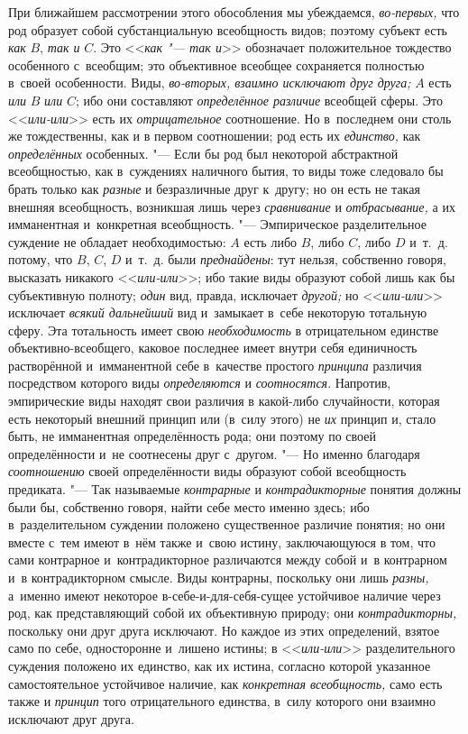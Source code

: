 При ближайшем рассмотрении этого обособления мы убеждаемся,
{\em во-первых,} что род
образует собой субстанциальную всеобщность видов; поэтому субъект есть
{\em как} $B$, {\em так и} $C$. Это <<{\em как "--- так и}>>
обозначает положительное тождество особенного с~всеобщим; это
объективное всеобщее сохраняется полностью в~своей особенности. Виды,
{\em во-вторых, взаимно исключают друг друга;} $A$ есть
{\em или} $B$ {\em или} $C$; ибо они составляют {\em определённое
различие} всеобщей сферы. Это <<{\em или-или}>> есть их {\em отрицательное}
соотношение. Но в~последнем они столь же тождественны, как и
в первом соотношении; род есть их {\em единство,} как {\em определённых}
особенных. "--- Если бы род был некоторой
абстрактной всеобщностью, как в~суждениях наличного бытия, то виды тоже
следовало бы брать только как {\em разные} и
безразличные друг к~другу; но он есть не такая внешняя всеобщность,
возникшая лишь через {\em сравнивание} и {\em отбрасывание,}
а их имманентная и~конкретная всеобщность. "---
Эмпирическое разделительное суждение не обладает
необходимостью: $A$ есть либо $B$, либо $C$, либо $D$ и~т.~д.
потому, что $B$, $C$, $D$ и~т.~д. были {\em преднайдены}: тут
нельзя, собственно говоря, высказать никакого <<{\em или-или}>>; ибо
такие виды образуют собой лишь как бы субъективную полноту;
{\em один} вид, правда, исключает {\em другой;} но <<{\em или-или}>>
исключает {\em всякий дальнейший} вид и~замыкает в~себе некоторую
тотальную сферу. Эта тотальность имеет свою {\em необходимость} в
отрицательном единстве объективно-всеобщего, каковое последнее имеет внутри
себя единичность растворённой и~имманентной себе в~качестве простого
{\em принципа} различия посредством которого виды {\em определяются} и
{\em соотносятся}. Напротив, эмпирические виды находят свои различия в
какой-либо случайности, которая есть некоторый внешний принцип или (в~силу
этого) не {\em их} принцип и, стало быть, не имманентная определённость рода;
они поэтому по своей определённости и~не соотнесены друг с~другом. "---
Но именно благодаря {\em соотношению} своей
определённости виды образуют собой всеобщность предиката. "--- Так называемые
{\em контрарные} и {\em контрадикторные}
понятия должны были бы, собственно говоря, найти себе место
именно здесь; ибо в~разделительном суждении положено существенное различие
понятия; но они вместе с~тем имеют в~нём также и~свою истину, заключающуюся
в том, что сами контрарное и~контрадикторное различаются между собой и~в
контрарном и~в контрадикторном смысле. Виды контрарны, поскольку они лишь
{\em разны,} а~именно
имеют некоторое в-себе-и-для-себя-сущее устойчивое наличие через род, как
представляющий собой их объективную природу; они {\em контрадикторны,}
поскольку они друг друга исключают. Но каждое из этих
определений, взятое само по себе, односторонне и~лишено истины; в
<<{\em или-или}>>
разделительного суждения положено их единство, как их истина,
согласно которой указанное самостоятельное устойчивое наличие, как
{\em конкретная всеобщность,} само есть также и {\em принцип} того
отрицательного единства, в~силу которого они взаимно исключают друг друга.

